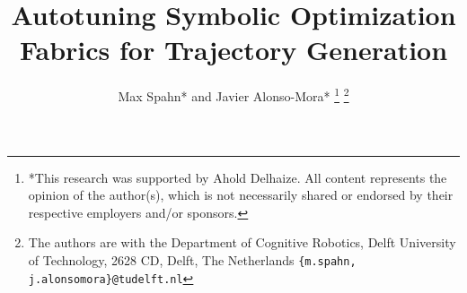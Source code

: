 \title{\LARGE \bf
Autotuning Symbolic Optimization Fabrics for Trajectory Generation
}


\author{Max Spahn* and Javier Alonso-Mora*%
\thanks{*This research was supported by Ahold Delhaize. All content represents the opinion of the author(s), which is not necessarily shared or endorsed by their respective employers and/or sponsors.}%
\thanks{The authors are with the Department of Cognitive Robotics, Delft University of Technology, 2628 CD, Delft, The Netherlands
       {\tt\small \{m.spahn, j.alonsomora\}@tudelft.nl}}
}
